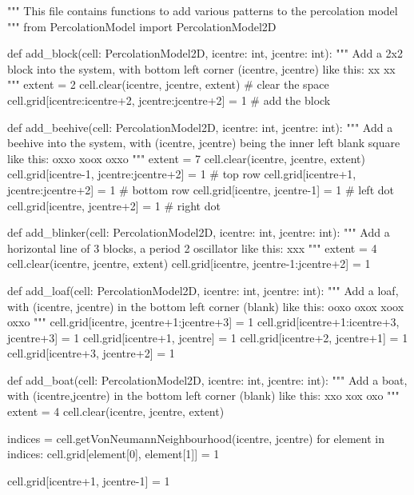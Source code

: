 \documentclass[bibend=bibtex,lang=cn,11pt,a4paper]{elegantpaper}
\begin{document}
\begin{python}
"""
This file contains functions to add various patterns to the percolation model
"""
from PercolationModel import PercolationModel2D


def add_block(cell: PercolationModel2D, icentre: int, jcentre: int):
    """
    Add a 2x2 block into the system, with bottom left corner (icentre, jcentre)
    like this:
        xx\n
        xx\n
    """
    extent = 2
    cell.clear(icentre, jcentre, extent)                 # clear the space
    cell.grid[icentre:icentre+2, jcentre:jcentre+2] = 1  # add the block


def add_beehive(cell: PercolationModel2D, icentre: int, jcentre: int):
    """
    Add a beehive into the system, with (icentre, jcentre) being the inner left blank square
    like this:
        oxxo\n
        xoox\n
        oxxo\n
    """
    extent = 7
    cell.clear(icentre, jcentre, extent)
    cell.grid[icentre-1, jcentre:jcentre+2] = 1  # top row
    cell.grid[icentre+1, jcentre:jcentre+2] = 1  # bottom row
    cell.grid[icentre, jcentre-1] = 1            # left dot
    cell.grid[icentre, jcentre+2] = 1            # right dot


def add_blinker(cell: PercolationModel2D, icentre: int, jcentre: int):
    """
    Add a horizontal line of 3 blocks, a period 2 oscillator
    like this:
        xxx\n
    """
    extent = 4
    cell.clear(icentre, jcentre, extent)
    cell.grid[icentre, jcentre-1:jcentre+2] = 1


def add_loaf(cell: PercolationModel2D, icentre: int, jcentre: int):
    """
    Add a loaf, with (icentre, jcentre) in the bottom left corner (blank)   
    like this:
        ooxo\n
        oxox\n
        xoox\n
        oxxo\n
    """
    cell.grid[icentre, jcentre+1:jcentre+3] = 1
    cell.grid[icentre+1:icentre+3, jcentre+3] = 1
    cell.grid[icentre+1, jcentre] = 1
    cell.grid[icentre+2, jcentre+1] = 1
    cell.grid[icentre+3, jcentre+2] = 1


def add_boat(cell: PercolationModel2D, icentre: int, jcentre: int):
    """
    Add a boat, with (icentre,jcentre) in the bottom left corner (blank)
    like this:
        xxo\n
        xox\n
        oxo\n
    """
    extent = 4
    cell.clear(icentre, jcentre, extent)

    indices = cell.getVonNeumannNeighbourhood(icentre, jcentre)
    for element in indices:
        cell.grid[element[0], element[1]] = 1

    cell.grid[icentre+1, jcentre-1] = 1



\end{python}
\end{document}
